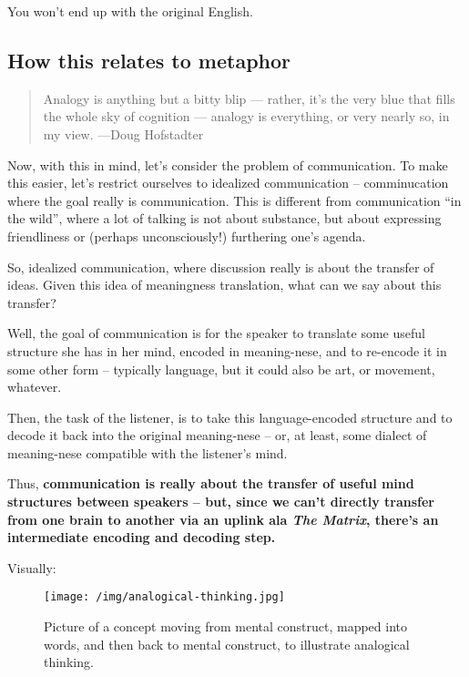 You won't end up with the original English.

\subsection{How this relates to
metaphor}\label{how-this-relates-to-metaphor}

\begin{quote}
Analogy is anything but a bitty blip --- rather, it's the very blue that
fills the whole sky of cognition --- analogy is everything, or very
nearly so, in my view. \label{quote-attribute}{---Doug Hofstadter}
\end{quote}

Now, with this in mind, let's consider the problem of communication. To
make this easier, let's restrict ourselves to idealized communication --
comminucation where the goal really is communication. This is different
from communication ``in the wild'', where a lot of talking is not about
substance, but about expressing friendliness or (perhaps unconsciously!)
furthering one's agenda.

So, idealized communication, where discussion really is about the
transfer of ideas. Given this idea of meaningness translation, what can
we say about this transfer?

Well, the goal of communication is for the speaker to translate some
useful structure she has in her mind, encoded in meaning-nese, and to
re-encode it in some other form -- typically language, but it could also
be art, or movement, whatever.

Then, the task of the listener, is to take this language-encoded
structure and to decode it back into the original meaning-nese -- or, at
least, some dialect of meaning-nese compatible with the listener's mind.

Thus, \textbf{communication is really about the transfer of useful mind
structures between speakers -- but, since we can't directly transfer
from one brain to another via an uplink ala \emph{The Matrix}, there's
an intermediate encoding and decoding step.}

Visually:

\begin{figure}[htbp]
\centering
\texttt{[image: /img/analogical-thinking.jpg]}
\caption{Picture of a concept moving from mental construct, mapped into
words, and then back to mental construct, to illustrate analogical
thinking.}
\end{figure}

